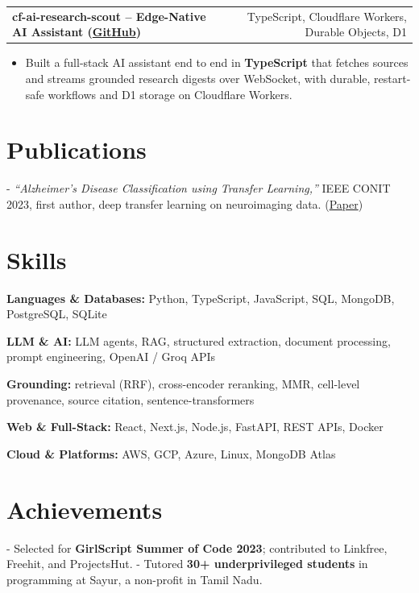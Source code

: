 \documentclass[letterpaper,11pt]{article}
\makeatletter
\newcommand{\projItem}[2]{%
  \vspace{6pt}
  \begin{tabular*}{\textwidth}{@{}l@{\extracolsep{\fill}}r@{}}
    \textbf{#1} & #2 \\
  \end{tabular*}\par\vspace{-2pt}
}
\newcommand{\skillLine}[2]{\textbf{#1:} #2\par\vspace{2pt}}
\newcommand{\inlineBlock}[1]{{\setlength{\leftskip}{0.18in}\small #1\par}}
\makeatother
\begin{document}
\projItem{cf-ai-research-scout -- Edge-Native AI Assistant {\normalfont\small(\href{https://github.com/Deva-1903/cf_ai_research_scout}{GitHub})}}{TypeScript, Cloudflare Workers, Durable Objects, D1}
\begin{itemize}
  \item Built a full-stack AI assistant end to end in \textbf{TypeScript} that fetches sources and streams grounded research digests over WebSocket, with durable, restart-safe workflows and D1 storage on Cloudflare Workers.
\end{itemize}

\section{Publications}
\inlineBlock{- \textit{``Alzheimer's Disease Classification using Transfer Learning,''} IEEE CONIT 2023, first author, deep transfer learning on neuroimaging data. {\normalfont\small(\href{https://ieeexplore.ieee.org/document/10205760}{Paper})}}

\section{Skills}
\skillLine{Languages \& Databases}{Python, TypeScript, JavaScript, SQL, MongoDB, PostgreSQL, SQLite}
\skillLine{LLM \& AI}{LLM agents, RAG, structured extraction, document processing, prompt engineering, OpenAI / Groq APIs}
\skillLine{Grounding}{retrieval (RRF), cross-encoder reranking, MMR, cell-level provenance, source citation, sentence-transformers}
\skillLine{Web \& Full-Stack}{React, Next.js, Node.js, FastAPI, REST APIs, Docker}
\skillLine{Cloud \& Platforms}{AWS, GCP, Azure, Linux, MongoDB Atlas}

\section{Achievements}
\inlineBlock{- Selected for \textbf{GirlScript Summer of Code 2023}; contributed to Linkfree, Freehit, and ProjectsHut. - Tutored \textbf{30+ underprivileged students} in programming at Sayur, a non-profit in Tamil Nadu.}
\end{document}
